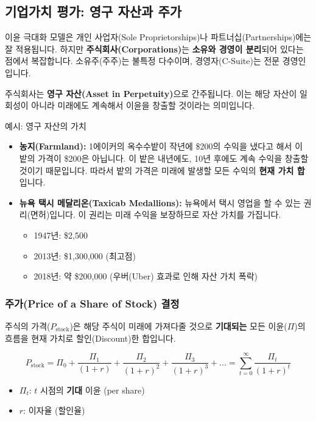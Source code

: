 \documentclass[11pt,a4paper]{book}
\theoremstyle{definition}
\begin{document}
\subsection{기업가치 평가: 영구 자산과 주가}

이윤 극대화 모델은 개인 사업자(Sole Proprietorships)나 파트너십(Partnerships)에는 잘 적용됩니다.
하지만 \textbf{주식회사(Corporations)}는 \textbf{소유와 경영이 분리}되어 있다는 점에서 복잡합니다.
소유주(주주)는 불특정 다수이며, 경영자(C-Suite)는 전문 경영인입니다.

주식회사는 \textbf{영구 자산(Asset in Perpetuity)}으로 간주됩니다.
이는 해당 자산이 일회성이 아니라 미래에도 계속해서 이윤을 창출할 것이라는 의미입니다.

\begin{mybox}{예시: 영구 자산의 가치}
\begin{itemize}
    \item \textbf{농지(Farmland):} 1에이커의 옥수수밭이 작년에 \$200의 수익을 냈다고 해서 이 밭의 가격이 \$200은 아닙니다. 이 밭은 내년에도, 10년 후에도 계속 수익을 창출할 것이기 때문입니다. 따라서 밭의 가격은 미래에 발생할 모든 수익의 \textbf{현재 가치 합}입니다.
    \item \textbf{뉴욕 택시 메달리온(Taxicab Medallions):} 뉴욕에서 택시 영업을 할 수 있는 권리(면허)입니다. 이 권리는 미래 수익을 보장하므로 자산 가치를 가집니다.
    \begin{itemize}
        \item 1947년: \$2,500
        \item 2013년: \$1,300,000 (최고점)
        \item 2018년: 약 \$200,000 (우버(Uber) 효과로 인해 자산 가치 폭락)
    \end{itemize}
\end{itemize}
\end{mybox}

\subsubsection{주가(Price of a Share of Stock) 결정}
주식의 가격($P_{\text{stock}}$)은 해당 주식이 미래에 가져다줄 것으로 \textbf{기대되는} 모든 이윤($\Pi$)의 흐름을 현재 가치로 할인(Discount)한 합입니다.

$$
P_{\text{stock}} = \Pi_0 + \frac{\Pi_1}{(1+r)} + \frac{\Pi_2}{(1+r)^2} + \frac{\Pi_3}{(1+r)^3} + \dots = \sum_{t=0}^{\infty} \frac{\Pi_t}{(1+r)^t}
$$

\begin{itemize}
    \item $\Pi_t$: $t$ 시점의 \textbf{기대} 이윤 (per share)
    \item $r$: 이자율 (할인율)
\end{itemize}
\end{document}
